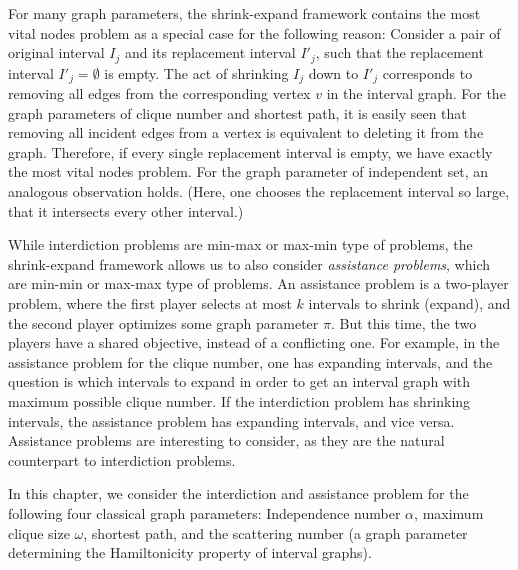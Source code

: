 For many graph parameters, the shrink-expand framework contains the most vital nodes problem as a special case for the following reason: Consider a pair of original interval $I_j$ and its replacement interval $I'_j$, such that the replacement interval $I'_j = \emptyset$ is empty. The act of shrinking $I_j$ down to $I'_j$ corresponds to removing all edges from the corresponding vertex $v$ in the interval graph. For the graph parameters of  clique number and shortest path, it is easily seen that removing all incident edges from a vertex is equivalent to deleting it from the graph. Therefore, if every single replacement interval is empty, we have exactly the most vital nodes problem. For the graph parameter of independent set, an analogous observation holds. (Here, one chooses the replacement interval so large, that it intersects every other interval.)


While interdiction problems are min-max or max-min type of problems, the shrink-expand framework allows us to also consider \emph{assistance problems}, which are min-min or max-max type of problems. An assistance problem is a two-player problem, where the first player selects at most $k$ intervals to shrink (expand), and the second player optimizes some graph parameter $\pi$. But this time, the two players have a shared objective, instead of a conflicting one. For example, in the assistance problem for the clique number, one has expanding intervals, and the question is which intervals to expand in order to get an interval graph with maximum possible clique number.
If the interdiction problem has shrinking intervals, the assistance problem has expanding intervals, and vice versa. Assistance problems are interesting to consider, as they are the natural counterpart to interdiction problems. 

In this chapter, we consider the interdiction and assistance problem for the following 
four classical graph parameters: 
Independence number $\alpha$, maximum clique size $\omega$, shortest path, 
and the scattering number (a graph parameter determining the Hamiltonicity property of interval graphs). 

